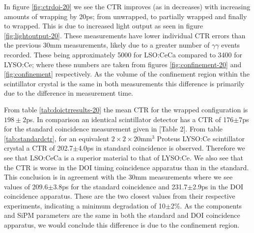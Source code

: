 In figure \ref{fig:ctrdoi-20} we see the CTR improves (as in decreases) with increasing amounts of wrapping by 20ps; from unwrapped, to partially wrapped and finally to wrapped. This is due to increased light output as seen in figure \ref{fig:lightoutput-20}. These measurements have lower individual CTR errors than the previous 30mm measurements, likely due to a greater number of $\gamma\gamma$ events recorded. These being approximately 5000 for LSO:CeCa compared to 3400 for LYSO:Ce; where these numbers are taken from figures \ref{fig:confinement-20} and \ref{fig:confinement} respectively. As the volume of the confinement region within the scintillator crystal is the same in both measurements this difference is primarily due to the difference in measurement time. 

From table \ref{tab:doictrresults-20} the mean CTR for the wrapped configuration is $198\pm2$ps. In comparison an identical scintillator detector has a CTR of 176$\pm$7ps for the standard coincidence measurement given in [Table 2]\cite{uffray_Jarron_Meyer_Lecoq_2014}. From table \ref{tab:standardctr}, for an equivalent $2\times2\times20$mm$^3$ Proteus LYSO:Ce scintillator crystal a CTR of 202.7$\pm$4.0ps in standard coincidence is observed. Therefore we see that LSO:CeCa is a superior material to that of LYSO:Ce. We also see that the CTR is worse in the DOI timing coincidence apparatus than in the standard. This conclusion is in agreement with the 30mm measurements where we see values of 209.6$\pm$3.8ps for the standard coincidence and 231.7$\pm$2.9ps in the DOI coincidence apparatus. These are the two closest values from their respective experiments, indicating a minimum degradation of 10$\pm$2\%. As the components and SiPM parameters are the same in both the standard and DOI coincidence apparatus, we would conclude this difference is due to the confinement region.